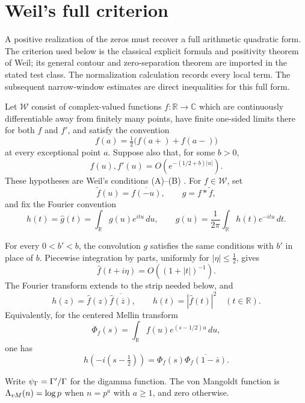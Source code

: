 \section{Weil's full criterion}
\label{sec:weil-full}

A positive realization of the zeros must recover a full arithmetic
quadratic form. The criterion used below is the classical explicit
formula and positivity theorem of Weil; its general contour and
zero-separation theorem are imported in the stated test class. The
normalization calculation records every local term. The subsequent
narrow-window estimates are direct inequalities for this full form.

\begin{definition}
\label{def:weil-class}
Let \(\mathcal W\) consist of complex-valued functions
\(f:\mathbb R\to\mathbb C\) which are continuously differentiable away
from finitely many points, have finite one-sided limits there for both
\(f\) and \(f'\), and satisfy the convention
\[
 f(a)=\tfrac12\bigl(f(a+)+f(a-)\bigr)
\]
at every exceptional point \(a\).  Suppose also that, for some \(b>0\),
\[
 f(u),f'(u)=O(e^{-(1/2+b)|u|}).
\]
These hypotheses are Weil's conditions (A)--(B)
\cite[p.~259]{Weil1952}.
For \(f\in\mathcal W\), set
\[
 \widetilde f(u)=\overline{f(-u)},\qquad g=f*\widetilde f,
\]
and fix the Fourier convention
\[
 h(t)=\widehat g(t)=\int_{\mathbb R}g(u)e^{itu}\,du,
 \qquad
 g(u)=\frac1{2\pi}\int_{\mathbb R}h(t)e^{-itu}\,dt.
\]
\end{definition}

For every \(0<b'<b\), the convolution \(g\) satisfies the same conditions
with \(b'\) in place of \(b\).  Piecewise integration by parts, uniformly
for \(|\eta|\leq\tfrac12\), gives
\[
 \widehat f(t+i\eta)=O((1+|t|)^{-1}).
\]
The Fourier transform extends to the strip needed below, and
\[
 h(z)=\widehat f(z)\overline{\widehat f(\overline z)},
 \qquad h(t)=|\widehat f(t)|^2\quad(t\in\mathbb R).
\]
Equivalently, for the centered Mellin transform
\[
 \Phi_f(s)=\int_{\mathbb R}f(u)e^{(s-1/2)u}\,du,
\]
one has
\[
 h\!\left(-i(s-\tfrac12)\right)
 =\Phi_f(s)\overline{\Phi_f(1-\overline s)}.
\]

Write $\psi_{\Gamma}=\Gamma'/\Gamma$ for the digamma function.
The von Mangoldt function is $\Lambda_{vM}(n)=\log p$ when $n=p^a$
with $a\ge1$, and zero otherwise.

